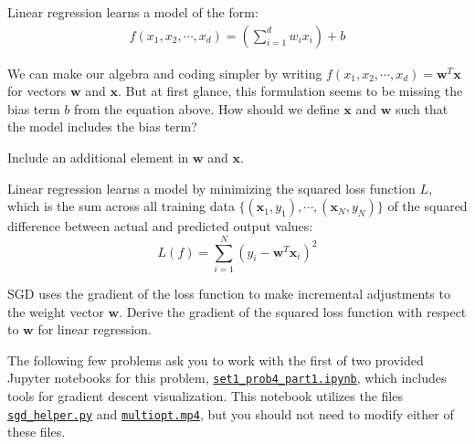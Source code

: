 Linear regression learns a model of the form:
\begin{align*}
  f(x_1, x_2, \cdots, x_d) = \left(\sum_{i=1}^d w_i x_i\right) + b
\end{align*}

\begin{problem}[2]
  We can make our algebra and coding simpler by writing $f(x_1, x_2, \cdots, x_d) = \mathbf{w}^T\mathbf{x}$ for vectors $\mathbf{w}$ and $\mathbf{x}$.  But at first glance, this formulation seems to be missing the bias term $b$ from the equation above.  How should we define $\mathbf{x}$ and $\mathbf{w}$ such that the model includes the bias term?
\end{problem}
\begin{hint}
  Include an additional element in $\mathbf{w}$ and $\mathbf{x}$.
\end{hint}
\begin{solution}
  
\end{solution}

Linear regression learns a model by minimizing the squared loss function $L$, which is the sum across all training data $\{(\mathbf{x}_1, y_1),\cdots,(\mathbf{x}_N, y_N)\}$ of the squared difference between actual and predicted output values:
\[L(f) = \sum_{i=1}^N (y_i - \mathbf{w}^T\mathbf{x}_i)^2\]

\begin{problem}[2]
  SGD uses the gradient of the loss function to make incremental adjustments to the weight vector $\mathbf{w}$. Derive the gradient of the squared loss function with respect to $\mathbf{w}$ for linear regression.
\end{problem}
\begin{solution}
  
\end{solution}

The following few problems ask you to work with the first of two provided Jupyter notebooks for this problem, \href{https://github.com/lakigigar/Caltech-CS155-2021/blob/main/psets/set1/set1_prob4_part1.ipynb}{\texttt{set1_prob4_part1.ipynb}}, which includes tools for gradient descent visualization. This notebook utilizes the files \href{https://github.com/lakigigar/Caltech-CS155-2021/blob/main/psets/set1/sgd_helper.py}{\texttt{sgd_helper.py}} and \href{https://github.com/lakigigar/Caltech-CS155-2021/blob/main/psets/set1/multiopt.mp4}{\texttt{multiopt.mp4}}, but you should not need to modify either of these files. 

